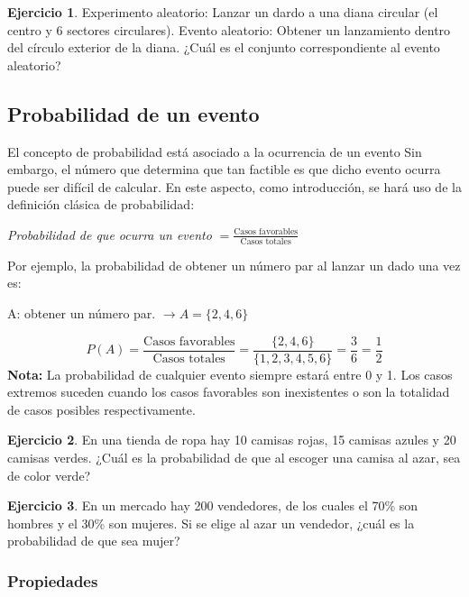 \documentclass[
  11pt,
]{book}
\theoremstyle{definition}
\theoremstyle{definition}
\theoremstyle{definition}
\newtheorem{exercise}{Ejercicio}[chapter]
\theoremstyle{definition}
\theoremstyle{remark}
\begin{document}
\begin{exercise}
Experimento aleatorio: Lanzar un dardo a una diana circular (el centro y 6 sectores circulares). Evento aleatorio: Obtener un lanzamiento dentro del círculo exterior de la diana. ¿Cuál es el conjunto correspondiente al evento aleatorio?
\end{exercise}

\subsection{Probabilidad de un evento}\label{probabilidad-evento}

El concepto de probabilidad está asociado a la ocurrencia de un evento Sin embargo, el número que determina que tan factible es que dicho evento ocurra puede ser difícil de calcular. En este aspecto, como introducción, se hará uso de la definición clásica de probabilidad:

\emph{Probabilidad de que ocurra un evento} \(= \displaystyle\frac{\text{Casos favorables}}{\text{Casos totales}}\)

Por ejemplo, la probabilidad de obtener un número par al lanzar un dado una vez es:

A: obtener un número par. \(\rightarrow A = \lbrace 2,4,6 \rbrace\)

\[P(A) = \frac{\text{Casos favorables}}{\text{Casos totales}} = \frac{\lbrace 2,4,6 \rbrace}{\lbrace 1,2,3,4,5,6 \rbrace} = \frac{3}{6}= \frac{1}{2}\]
\textbf{Nota:} La probabilidad de cualquier evento siempre estará entre 0 y 1. Los casos extremos suceden cuando los casos favorables son inexistentes o son la totalidad de casos posibles respectivamente.

\begin{exercise}
En una tienda de ropa hay 10 camisas rojas, 15 camisas azules y 20 camisas verdes. ¿Cuál es la probabilidad de que al escoger una camisa al azar, sea de color verde?
\end{exercise}

\begin{exercise}
En un mercado hay 200 vendedores, de los cuales el 70\% son hombres y el 30\% son mujeres. Si se elige al azar un vendedor, ¿cuál es la probabilidad de que sea mujer?
\end{exercise}

\subsubsection{Propiedades}\label{propiedades}
\end{document}
